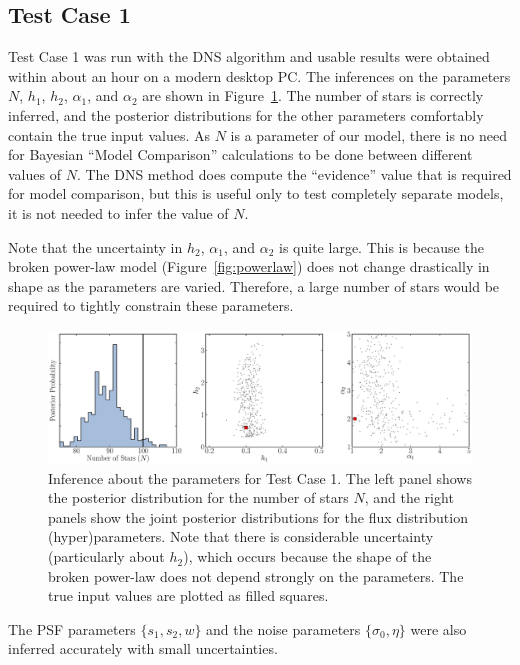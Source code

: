 \documentclass[12pt, preprint]{aastex}
\begin{document}
\subsection{Test Case 1}
Test Case 1 was run with the DNS algorithm and usable results were obtained
within about an hour on a modern desktop PC. The inferences on the parameters
$N$, $h_1$, $h_2$, $\alpha_1$, and $\alpha_2$ are shown in
Figure~\ref{fig:results1}. The number of stars is correctly inferred, and the
posterior distributions for the other parameters comfortably contain the true
input values. As $N$ is a parameter of our model, there is no need for Bayesian
``Model Comparison'' calculations to be done between different values of $N$.
The DNS method does compute the ``evidence'' value that is required for model
comparison, but this is useful only to test completely separate models, it
is not needed to infer the value of $N$.

Note that the uncertainty in $h_2$, $\alpha_1$, and $\alpha_2$ is
quite large. This is because the broken power-law model
(Figure~\ref{fig:powerlaw}) does not change drastically in shape as the
parameters are varied. Therefore, a large number of stars would be required to
tightly constrain these parameters.

\begin{figure}[ht!]
\begin{center}
\includegraphics[width=\textwidth]{Figures/inference1.eps}
\end{center}
\caption{Inference about the parameters for Test Case 1. The left panel shows
the posterior distribution for the number of stars $N$, and the right
panels show the joint posterior distributions for the flux distribution
(hyper)parameters. Note that there is
considerable uncertainty (particularly about $h_2$), which occurs because the
shape of the broken power-law does not depend strongly on the parameters.
The true input values are plotted as filled squares.
\label{fig:results1}}
\end{figure}

The PSF parameters $\{s_1, s_2, w\}$ and the noise parameters $\{\sigma_0, \eta\}$
were also inferred accurately with small uncertainties.
\end{document}

